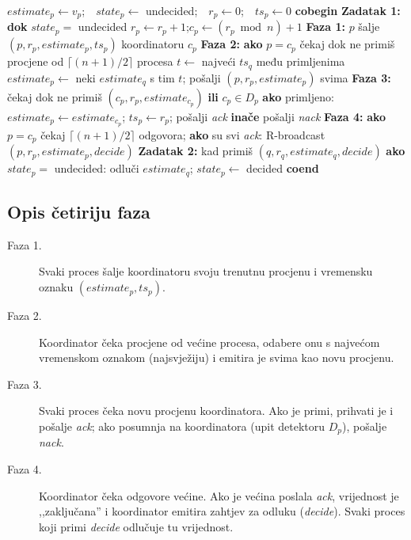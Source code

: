 \documentclass[11pt,a4paper]{article}
\newcommand{\eS}{\ensuremath{\Diamond\mathcal{S}}}
\begin{document}
\begin{algorithm}[H]
\caption{Konsenzus uz konačno jaki detektor $D \in \eS$ (rotirajući koordinator,
na procesu $p$)}
\label{alg:eS}
\begin{algorithmic}[1]
\State $estimate_p \gets v_p$;\ \ $state_p \gets$ undecided;\ \ $r_p \gets 0$;\ \ $ts_p \gets 0$
\Statex \textbf{cobegin}
\Statex \textbf{Zadatak 1:} \textbf{dok} $state_p =$ undecided
  \State \quad $r_p \gets r_p + 1$;\quad $c_p \gets (r_p \bmod n) + 1$
  \Statex \quad \textbf{Faza 1:} $p$ šalje $(p, r_p, estimate_p, ts_p)$ koordinatoru $c_p$
  \Statex \quad \textbf{Faza 2:} \textbf{ako} $p = c_p$
    \State \qquad čekaj dok ne primiš procjene od $\lceil (n{+}1)/2 \rceil$ procesa
    \State \qquad $t \gets$ najveći $ts_q$ među primljenima
    \State \qquad $estimate_p \gets$ neki $estimate_q$ s tim $t$; pošalji
    $(p, r_p, estimate_p)$ svima
  \Statex \quad \textbf{Faza 3:} čekaj dok ne primiš $(c_p, r_p, estimate_{c_p})$
  \textbf{ili} $c_p \in D_p$
    \State \qquad \textbf{ako} primljeno: $estimate_p \gets estimate_{c_p}$;
    $ts_p \gets r_p$; pošalji \textit{ack}
    \State \qquad \textbf{inače} pošalji \textit{nack} 
  \Statex \quad \textbf{Faza 4:} \textbf{ako} $p = c_p$
    \State \qquad čekaj $\lceil (n{+}1)/2 \rceil$ odgovora; \textbf{ako} su svi
    \textit{ack}: R-broadcast $(p, r_p, estimate_p, \textit{decide})$
\Statex \textbf{Zadatak 2:} kad primiš $(q, r_q, estimate_q, \textit{decide})$
  \State \quad \textbf{ako} $state_p =$ undecided: odluči $estimate_q$;
  $state_p \gets$ decided
\Statex \textbf{coend}
\end{algorithmic}
\end{algorithm}

\subsection{Opis četiriju faza}

\begin{description}
  \item[Faza 1.] Svaki proces šalje koordinatoru svoju trenutnu procjenu i
  vremensku oznaku $(estimate_p, ts_p)$.
  \item[Faza 2.] Koordinator čeka procjene od većine procesa, odabere onu s
  najvećom vremenskom oznakom (najsvježiju) i emitira je svima kao novu procjenu.
  \item[Faza 3.] Svaki proces čeka novu procjenu koordinatora. Ako je primi,
  prihvati je i pošalje \textit{ack}; ako posumnja na koordinatora (upit
  detektoru $D_p$), pošalje \textit{nack}.
  \item[Faza 4.] Koordinator čeka odgovore većine. Ako je većina poslala
  \textit{ack}, vrijednost je ,,zaključana'' i koordinator emitira zahtjev za
  odluku (\textit{decide}). Svaki proces koji primi \textit{decide} odlučuje tu
  vrijednost.
\end{description}
\end{document}
